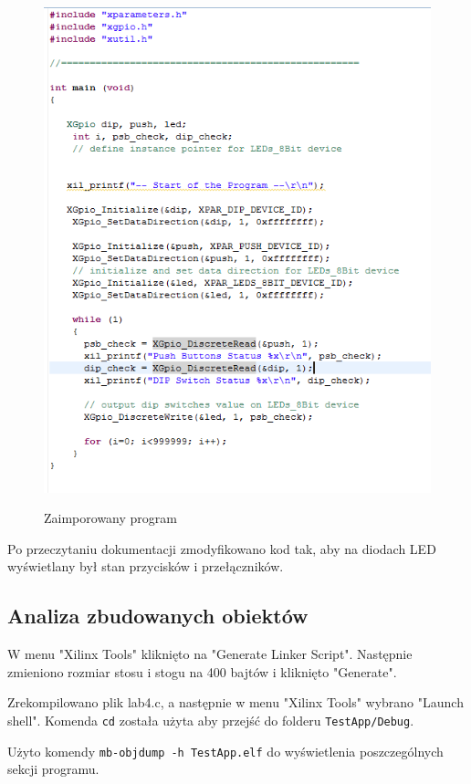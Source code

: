 \begin{figure}[h]
	\centering
	\includegraphics{img/program_1.PNG}
	\label{img:program_1}
	\caption{Zaimporowany program}
\end{figure}

Po przeczytaniu dokumentacji zmodyfikowano kod tak, aby na diodach LED wyświetlany był stan przycisków i przełączników.



\subsection{Analiza zbudowanych obiektów}
W menu "Xilinx Tools" kliknięto na "Generate Linker Script". Następnie zmieniono rozmiar stosu i stogu na 400 bajtów i kliknięto "Generate".

Zrekompilowano plik lab4.c, a następnie w menu "Xilinx Tools" wybrano "Launch shell". Komenda \verb+cd+ została użyta aby przejść do folderu \verb+TestApp/Debug+.

Użyto komendy \verb`mb-objdump -h TestApp.elf` do wyświetlenia poszczególnych sekcji programu.
\newpage


